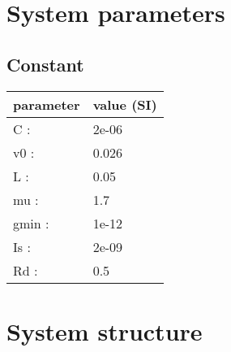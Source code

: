 \documentclass[11pt, oneside]{article}      %
\begin{document}
\section{System parameters}
%
%
\subsection{Constant}
%
\begin{center}
%
\begin{tabular}{ll}
%
\hline
parameter & value (SI)
\\ \hline
C :& 2e-06
\\
v0 :& 0.026
\\
L :& 0.05
\\
mu :& 1.7
\\
gmin :& 1e-12
\\
Is :& 2e-09
\\
Rd :& 0.5
\\
\hline
\end{tabular}
%
\end{center}
%
\section{System structure}
%
\end{document}

